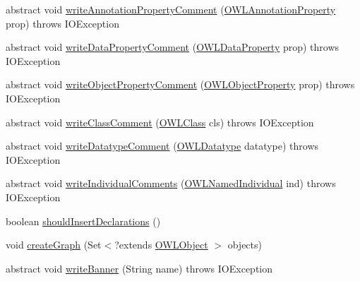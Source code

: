 \begin{DoxyCompactItemize}
abstract void \hyperlink{classorg_1_1coode_1_1owlapi_1_1rdf_1_1renderer_1_1_r_d_f_renderer_base_a561d5255d3390e391f2c7989d0afb969}{write\-Annotation\-Property\-Comment} (\hyperlink{interfaceorg_1_1semanticweb_1_1owlapi_1_1model_1_1_o_w_l_annotation_property}{O\-W\-L\-Annotation\-Property} prop)  throws I\-O\-Exception
\item 
abstract void \hyperlink{classorg_1_1coode_1_1owlapi_1_1rdf_1_1renderer_1_1_r_d_f_renderer_base_acdd9fb3120201b2af431b1d753842405}{write\-Data\-Property\-Comment} (\hyperlink{interfaceorg_1_1semanticweb_1_1owlapi_1_1model_1_1_o_w_l_data_property}{O\-W\-L\-Data\-Property} prop)  throws I\-O\-Exception
\item 
abstract void \hyperlink{classorg_1_1coode_1_1owlapi_1_1rdf_1_1renderer_1_1_r_d_f_renderer_base_a882d68e46ab078eea75f846588189b10}{write\-Object\-Property\-Comment} (\hyperlink{interfaceorg_1_1semanticweb_1_1owlapi_1_1model_1_1_o_w_l_object_property}{O\-W\-L\-Object\-Property} prop)  throws I\-O\-Exception
\item 
abstract void \hyperlink{classorg_1_1coode_1_1owlapi_1_1rdf_1_1renderer_1_1_r_d_f_renderer_base_a6086a9742dca4b8d54bb20d82b7721a1}{write\-Class\-Comment} (\hyperlink{interfaceorg_1_1semanticweb_1_1owlapi_1_1model_1_1_o_w_l_class}{O\-W\-L\-Class} cls)  throws I\-O\-Exception
\item 
abstract void \hyperlink{classorg_1_1coode_1_1owlapi_1_1rdf_1_1renderer_1_1_r_d_f_renderer_base_a807485dba2b1d4c77bc27b7dc437a703}{write\-Datatype\-Comment} (\hyperlink{interfaceorg_1_1semanticweb_1_1owlapi_1_1model_1_1_o_w_l_datatype}{O\-W\-L\-Datatype} datatype)  throws I\-O\-Exception
\item 
abstract void \hyperlink{classorg_1_1coode_1_1owlapi_1_1rdf_1_1renderer_1_1_r_d_f_renderer_base_a11e4f479b9aab2f18331cc3ab52f9a20}{write\-Individual\-Comments} (\hyperlink{interfaceorg_1_1semanticweb_1_1owlapi_1_1model_1_1_o_w_l_named_individual}{O\-W\-L\-Named\-Individual} ind)  throws I\-O\-Exception
\item 
boolean \hyperlink{classorg_1_1coode_1_1owlapi_1_1rdf_1_1renderer_1_1_r_d_f_renderer_base_a951d895d473b523ba4a7be51d63485e4}{should\-Insert\-Declarations} ()
\item 
void \hyperlink{classorg_1_1coode_1_1owlapi_1_1rdf_1_1renderer_1_1_r_d_f_renderer_base_a93418e196e205da0c25c4a8d7760129c}{create\-Graph} (Set$<$?extends \hyperlink{interfaceorg_1_1semanticweb_1_1owlapi_1_1model_1_1_o_w_l_object}{O\-W\-L\-Object} $>$ objects)
\item 
abstract void \hyperlink{classorg_1_1coode_1_1owlapi_1_1rdf_1_1renderer_1_1_r_d_f_renderer_base_ac3646d556d282454fae20c05669ca8c6}{write\-Banner} (String name)  throws I\-O\-Exception

\end{DoxyCompactItemize}
